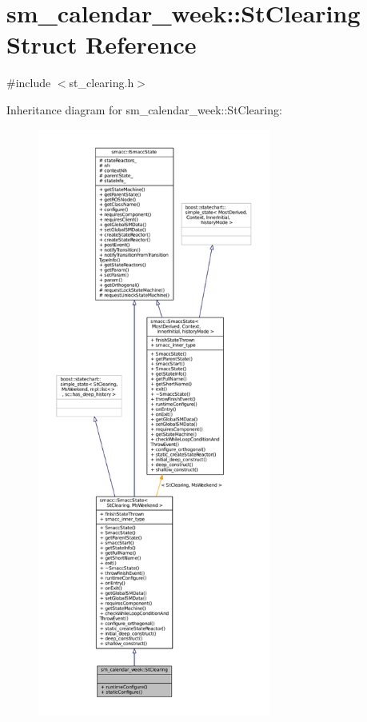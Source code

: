 \hypertarget{structsm__calendar__week_1_1StClearing}{}\section{sm\+\_\+calendar\+\_\+week\+:\+:St\+Clearing Struct Reference}
\label{structsm__calendar__week_1_1StClearing}


{\ttfamily \#include $<$st\+\_\+clearing.\+h$>$}



Inheritance diagram for sm\+\_\+calendar\+\_\+week\+:\+:St\+Clearing\+:
\nopagebreak
\begin{figure}[H]
\begin{center}
\leavevmode
\includegraphics[height=550pt]{structsm__calendar__week_1_1StClearing__inherit__graph}
\end{center}
\end{figure}


